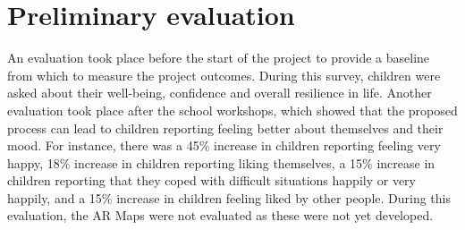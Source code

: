 \documentclass[acmlarge,screen,dvipsnames]{acmart}
\begin{document}




\section{Preliminary evaluation} \label{eval} An evaluation took place before
the start of the project to provide a baseline from which to measure the
project outcomes. During this survey, children were asked about their
well-being, confidence and overall resilience in life. Another evaluation took
place after the school workshops, which showed that the proposed process can
lead to children reporting feeling better about themselves and their mood. For
instance, there was a 45\% increase in children reporting feeling very happy,
18\% increase in children reporting liking themselves, a 15\% increase in
children reporting that they coped with difficult situations happily or very
happily, and a 15\% increase in children feeling liked by other people. During
this evaluation, the AR Maps were not evaluated as these were not yet
developed.
\end{document}

